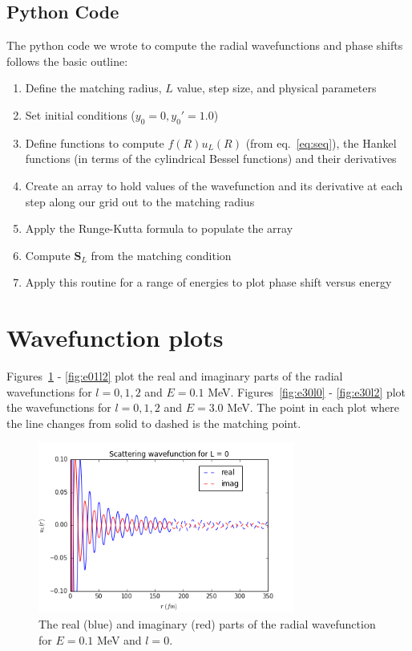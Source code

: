 \documentclass[]{scrartcl}
\begin{document}
\subsection*{Python Code}

The python code we wrote to compute the radial wavefunctions and phase shifts follows the basic outline:

\begin{enumerate}
	\item Define the matching radius, $L$ value, step size, and physical parameters
	\item Set initial conditions ($y_0 = 0, y_0 ' = 1.0$) 
	\item Define functions to compute $f(R)u_L(R)$ (from eq.~\ref{eq:seq}), the Hankel functions (in terms of the cylindrical Bessel functions) and their derivatives
	\item Create an array to hold values of the wavefunction and its derivative at each step along our grid out to the matching radius
	\item Apply the Runge-Kutta formula to populate the array
	\item Compute $\mathbf{S}_L$ from the matching condition
	\item Apply this routine for a range of energies to plot phase shift versus energy
\end{enumerate}


\section*{Wavefunction plots}

Figures~\ref{fig:e01l0} - \ref{fig:e01l2} plot the real and imaginary parts of the radial wavefunctions for $l=0,1,2$ and $E=0.1$ MeV. Figures~\ref{fig:e30l0} - \ref{fig:e30l2} plot the wavefunctions for $l=0,1,2$ and $E=3.0$ MeV. The point in each plot where the line changes from solid to dashed is the matching point.

\begin{figure}[h]
\centering
	\includegraphics[width=0.75\textwidth]{figures/E01/l0.png}
	\caption{The real (blue) and imaginary (red) parts of the radial wavefunction for $E = 0.1$ MeV and $l=0$.}
	\label{fig:e01l0}
\end{figure}
\end{document}
